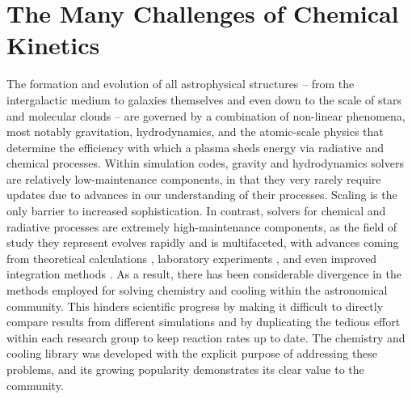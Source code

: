 \section{The Many Challenges of Chemical Kinetics}

The formation and evolution of all astrophysical structures -- from
the intergalactic medium to galaxies themselves and even down to the scale of
stars and molecular clouds -- are governed
by a combination of non-linear phenomena, most notably gravitation,
hydrodynamics, and the atomic-scale physics that determine the
efficiency with which a plasma sheds energy via radiative and
chemical processes.  Within simulation codes, gravity and
hydrodynamics solvers are relatively low-maintenance components, in
that they very rarely require updates due to advances in our
understanding of their processes.  Scaling is the only barrier to
increased sophistication.
In contrast, solvers for chemical and radiative processes are
extremely high-maintenance components, as the field of study they
represent evolves rapidly and is multifaceted, with advances coming
from theoretical calculations \citep[e.g.,][]{2007MNRAS.377..705F,
  2007MNRAS.382..133W, 2008MNRAS.388.1627G, 2008ApJ...689.1105L,
  2012JChPh.137o4303L, 2014ApJ...790...10S, 2015MNRAS.453..810L,
  2016MNRAS.457.3732C, 2017MNRAS.466.2175C}, laboratory experiments
\citep[e.g.,][]{2010Sci...329...69K, 2010PhRvA..82d2708B,
  2011PhRvA..84e2709M, 2015JPhCS.635b2092R, 2015ApJS..219....6O,
  2016ApJ...816...31D, 2016ApJ...832...31V}, and even improved integration
methods \citep[e.g.,][]{CURTIS2017312, 2014JCoPh.256..854N}.  As a result, there
has been considerable divergence in the methods employed for solving chemistry
and cooling within the astronomical community.  This hinders scientific
progress by making it difficult to directly compare results from
different simulations and by duplicating the tedious effort
within each research group to keep reaction rates up to date.   The
\grackle{} chemistry and cooling library was developed with the
explicit purpose of addressing these problems, and its growing popularity
demonstrates its clear value to the community.

